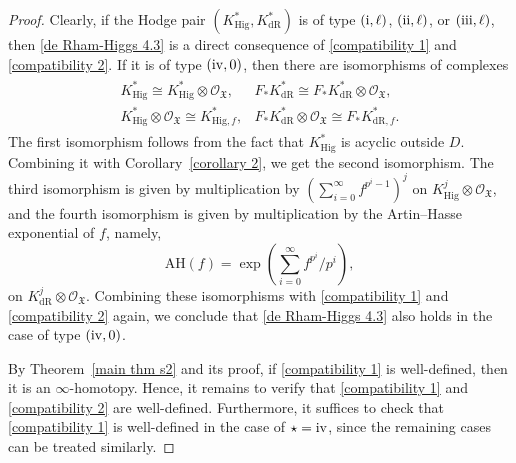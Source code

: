 \documentclass[12pt, a4paper]{article}
\begin{document}
\fi
\begin{proof}
Clearly, if the Hodge pair $(K^*_{\mathrm{Hig}}, K^*_{\mathrm{dR}})$ is of type $(\mathrm{\uppercase\expandafter{\romannumeral1}}, \ell)$, $(\mathrm{\uppercase\expandafter{\romannumeral2}}, \ell)$, or $(\mathrm{\uppercase\expandafter{\romannumeral3}}, \ell)$, then \eqref{de Rham-Higgs 4.3} is a direct consequence of \eqref{compatibility 1} and \eqref{compatibility 2}.
If it is of type $(\mathrm{\uppercase\expandafter{\romannumeral4}}, 0)$, then there are isomorphisms of complexes
\begin{eqnarray}\label{f-exponential}
\begin{array}{ll}
K^*_{\mathrm{Hig}} \cong K^*_{\mathrm{Hig}} \otimes \mathcal{O}_{\mathfrak{X}}, & 
F_* K^*_{\mathrm{dR}} \cong F_* K^*_{\mathrm{dR}} \otimes \mathcal{O}_{\mathfrak{X}}, \\
K^*_{\mathrm{Hig}} \otimes \mathcal{O}_{\mathfrak{X}} \cong K^*_{\mathrm{Hig}, f}, & 
F_* K^*_{\mathrm{dR}} \otimes \mathcal{O}_{\mathfrak{X}} \cong F_* K^*_{\mathrm{dR}, f}.
\end{array}
\end{eqnarray}
The first isomorphism follows from the fact that $K^*_{\mathrm{Hig}}$ is acyclic outside $D$. Combining it with Corollary~\ref{corollary 2}, we get the second isomorphism. 
The third isomorphism is given by multiplication by $\left( \sum_{i=0}^\infty f^{p^i - 1} \right)^j$ on $K^j_{\mathrm{Hig}} \otimes \mathcal{O}_{\mathfrak{X}}$, and the fourth isomorphism is given by multiplication by the Artin–Hasse exponential of $f$, namely,
\[
\mathrm{AH}(f) = \exp\left( \sum_{i=0}^\infty f^{p^i}/p^i \right),
\]
on $K^j_{\mathrm{dR}} \otimes \mathcal{O}_{\mathfrak{X}}$.
Combining these isomorphisms with \eqref{compatibility 1} and \eqref{compatibility 2} again, we conclude that \eqref{de Rham-Higgs 4.3} also holds in the case of type $(\mathrm{\uppercase\expandafter{\romannumeral4}}, 0)$.

By Theorem~\ref{main thm s2} and its proof, if \eqref{compatibility 1} is well-defined, then it is an $\infty$-homotopy. Hence, it remains to verify that \eqref{compatibility 1} and \eqref{compatibility 2} are well-defined. Furthermore, it suffices to check that \eqref{compatibility 1} is well-defined in the case of $\star = \mathrm{\uppercase\expandafter{\romannumeral4}}$, since the remaining cases can be treated similarly.


\end{proof}
\end{document}
